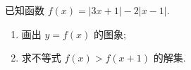 \begin{problem}
已知函数 \(f(x)=\lvert 3x+1\rvert-2\lvert x-1\rvert\).

\begin{enumerate}
\item 画出 \(y=f(x)\) 的图象;

\item 求不等式 \(f(x)>f(x+1)\) 的解集.
\end{enumerate}

\end{problem}

